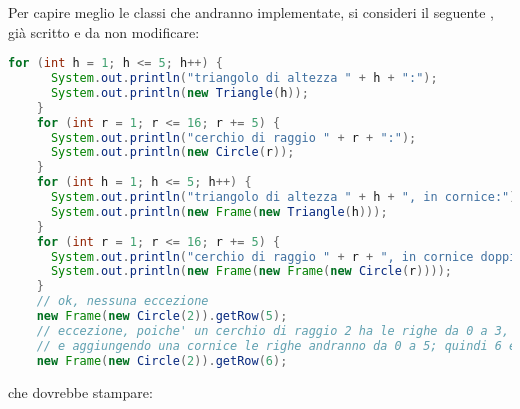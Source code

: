 \documentclass[12pt]{article}
\def\codesize{\smaller}
\def\<#1>{\codeid{#1}}
\newcommand{\codeid}[1]{\ifmmode{\mbox{\codesize\ttfamily{#1}}}\else{\codesize\ttfamily #1}\fi}
\begin{document}
Per capire meglio le classi che andranno implementate, si consideri il
seguente \<main>, gi\`a scritto e da non modificare:
%
\begin{lstlisting}[language=Java]
    for (int h = 1; h <= 5; h++) {
      System.out.println("triangolo di altezza " + h + ":");
      System.out.println(new Triangle(h));
    }
    for (int r = 1; r <= 16; r += 5) {
      System.out.println("cerchio di raggio " + r + ":");
      System.out.println(new Circle(r));
    }
    for (int h = 1; h <= 5; h++) {
      System.out.println("triangolo di altezza " + h + ", in cornice:");
      System.out.println(new Frame(new Triangle(h)));
    }
    for (int r = 1; r <= 16; r += 5) {
      System.out.println("cerchio di raggio " + r + ", in cornice doppia:");
      System.out.println(new Frame(new Frame(new Circle(r))));
    }
    // ok, nessuna eccezione
    new Frame(new Circle(2)).getRow(5);
    // eccezione, poiche' un cerchio di raggio 2 ha le righe da 0 a 3,
    // e aggiungendo una cornice le righe andranno da 0 a 5; quindi 6 e' fuori
    new Frame(new Circle(2)).getRow(6);
\end{lstlisting}
%
che dovrebbe stampare:
%
\end{document}
